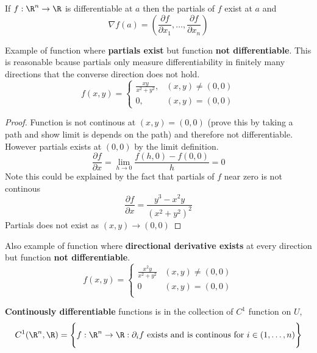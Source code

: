 \documentclass[11pt]{article}
\begin{document}
\begin{theorem*}
  \label{multivariable function gradient}
  If $f:\R^n\to \R$ is differentiable at $a$ then the partials of $f$ exist at $a$ and
  \[
    \nabla f(a) = (\frac{\partial f}{\partial x_1}, \dots, \frac{\partial f}{\partial x_n})
  \]
\end{theorem*}

\begin{rem}
  $ $\\
  Example of function where \textbf{partials exist} but function \textbf{not differentiable}. This is reasonable bcause partials only measure differentiability in finitely many directions that the converse direction does not hold.
  \[
    f(x,y) =
    \begin{cases}
      \frac{xy}{x^2 + y^2}, & (x,y) \neq (0,0)\\
      0, & (x,y)= (0,0)
    \end{cases}
  \]
  \begin{proof}
    Function is not continous at $(x,y)= (0,0)$ (prove this by taking a path and show limit is depends on the path) and therefore not differentiable. However partials exists at $(0,0)$ by the limit definition.
    \[
      \frac{\partial f}{\partial x} = \lim_{h\to 0} \frac{f(h,0) - f(0,0)}{h} = 0
    \]
    $ $\\
    Note this could be explained by the fact that partials of $f$ near zero is not continous
    \[
      \frac{\partial f}{\partial x} = \frac{y^3 - x^2y}{(x^2 + y^2)^2}
    \]
    Partials does not exist as $(x,y)\to (0,0)$
  \end{proof}

$ $\\Also example of function where \textbf{directional derivative exists} at every direction but function \textbf{not differentiable}.
  \[
    f(x,y) =
    \begin{cases}
      \frac{x^2y}{x^2 + y^2} & (x,y)\neq (0,0)\\
      0 & (x,y) = (0,0)\\
    \end{cases}
  \]

\end{rem}


\begin{defn*}
  \label{c1 function} \textbf{Continously differentiable} functions is in the collection of $C^1$ function on $U$,
  \[
    C^1(\R^n, \R) = \Bigg\{ f:\R^n\to \R: \partial_i f \text{ exists and is continous for } i\in (1,\dots,n) \Bigg\}
  \]
\end{defn*}
\end{document}
